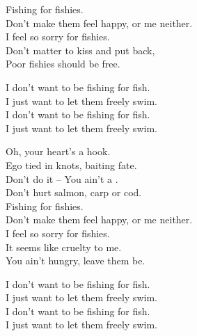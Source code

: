 
\label{album:fishing-for-fishiesp}





Fishing for fishies. \\
Don't make them feel happy, or me neither. \\
I feel so sorry for fishies. \\

Don't matter to kiss and put back, \\
Poor fishies should be free. \\


I don't want to be fishing for fish. \\
I just want to let them freely swim. \\
I don't want to be fishing for fish. \\
I just want to let them freely swim. \\


Oh, your heart's a hook. \\
Ego tied in knots, baiting fate. \\
Don't do it -- You ain't a . \\
Don't hurt salmon, carp or cod. \\

Fishing for fishies. \\
Don't make them feel happy, or me neither. \\
I feel so sorry for fishies. \\

It seems like cruelty to me. \\
You ain't hungry, leave them be. \\


I don't want to be fishing for fish. \\
I just want to let them freely swim. \\
I don't want to be fishing for fish. \\
I just want to let them freely swim. \\

